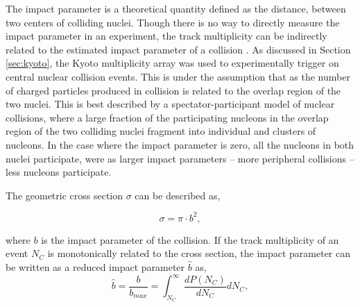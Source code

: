 The impact parameter is a theoretical quantity defined as the distance, between two centers of colliding nuclei. Though there is no way to directly measure the impact parameter in an experiment, the track multiplicity can be indirectly related to the estimated impact parameter of a collision \cite{impactpar}. As discussed in Section \ref{sec:kyoto}, the Kyoto multiplicity array was used to experimentally trigger on central nuclear collision events. This is under the assumption that as the number of charged particles produced in collision is related to the overlap region of the two nuclei. This is best described by a spectator-participant model of nuclear collisions, where a large fraction of the participating nucleons in the overlap region of the two colliding nuclei fragment into individual and clusters of nucleons. In the case where the impact parameter is zero, all the nucleons in both nuclei participate, were as larger impact parameters -- more peripheral collisions -- less nucleons participate. 



The geometric cross section $\sigma$ can be described as, 

\begin{equation}
\sigma = \pi \cdot b^2,
\label{eq:crossSect}
\end{equation}

where $b$ is the impact parameter of the collision.  If the track multiplicity of an event $N_C$ is monotonically related to the cross section, the impact parameter can be written as a reduced impact parameter $\hat{b}$ as,
\begin{equation}
\hat{b} =  \frac{b}{b_{max}} = \int^{\infty}_{N_C} \frac{dP(N_C)}{dN_C} dN_C,
\end{equation}


